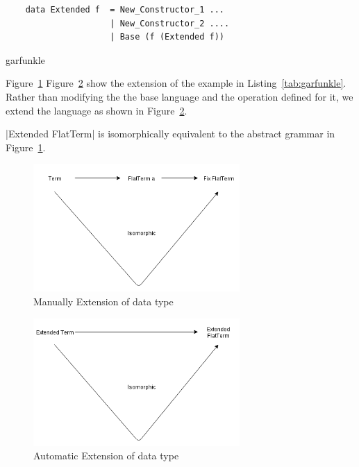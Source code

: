 \documentclass[thesis-solanki.tex]{subfiles}
\begin{document}
\begin{code-list}[H]
  \begin{verbatim}
    data Extended f  = New_Constructor_1 ...
                     | New_Constructor_2 ....
                     | Base (f (Extended f))
  \end{verbatim}
  \caption{garfunkle}
  \label{tab:garfunkle}
\end{code-list}


\begin{scope}\color[rgb]{0.5,0.8,0.8}
Figure~\ref{fig:manual-extension} Figure~\ref{fig:automatic-extension} show the extension of the example in Listing~\ref{tab:garfunkle}.
Rather than modifying the the base language and the operation defined for it, we extend the language as shown in 
Figure~\ref{fig:automatic-extension}. 

|Extended FlatTerm| is isomorphically equivalent to the abstract grammar in Figure~\ref{fig:manual-extension}.
\end{scope}

\begin{figure}[H]
  \centering
  \includegraphics[scale=0.1, width=0.7\textwidth]{extended_data_type_1.png}
  \caption{Manually Extension of data type}
  \label{fig:manual-extension}
\end{figure}

\begin{figure}[H]
  \centering
  \includegraphics[width=0.7\textwidth, scale=0.1]{extended_data_type_2.png}
  \caption{Automatic Extension of data type}
  \label{fig:automatic-extension}
\end{figure}
\end{document}
